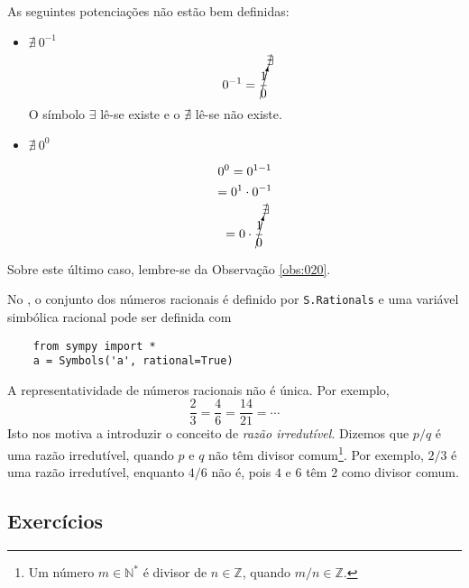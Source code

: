 \begin{obs}
  As seguintes potenciações não estão bem definidas:
  \begin{itemize}
  \item $\nexists ~0^{-1}$
    \begin{equation}
      0^{-1} = \cancelto{\nexists}{\frac{1}{0}}
    \end{equation}
    O símbolo $\exists$ lê-se existe e o $\nexists$ lê-se não existe.
    
  \item $\nexists ~0^0$

    \begin{gather}
      0^0 = 0^{1-1} \\
      = 0^1\cdot 0^{-1}\\
      = 0\cdot \cancelto{\nexists}{\frac{1}{0}}
    \end{gather}
  \end{itemize}
  Sobre este último caso, lembre-se da Observação \ref{obs:020}.
\end{obs}

\ifispython
\begin{obs}
  No \sympy, o conjunto dos números racionais é definido por \lstinline!S.Rationals! e uma variável simbólica racional pode ser definida com
  \begin{lstlisting}
    from sympy import *
    a = Symbols('a', rational=True)
  \end{lstlisting}
\end{obs}
\fi

\begin{obs}\label{obs:razao_irredutivel}
  A representatividade de números racionais não é única. Por exemplo,
  \begin{equation}
    \frac{2}{3} = \frac{4}{6} = \frac{14}{21} = \cdots
  \end{equation}
  Isto nos motiva a introduzir o conceito de \emph{razão irredutível}. Dizemos que $p/q$ é uma razão irredutível, quando $p$ e $q$ não têm divisor comum\footnote{Um número $m\in\mathbb{N}^*$ é divisor de $n\in\mathbb{Z}$, quando $m/n\in\mathbb{Z}$.}. Por exemplo, $2/3$ é uma razão irredutível, enquanto $4/6$ não é, pois $4$ e $6$ têm $2$ como divisor comum.
\end{obs}

\subsection*{Exercícios}

